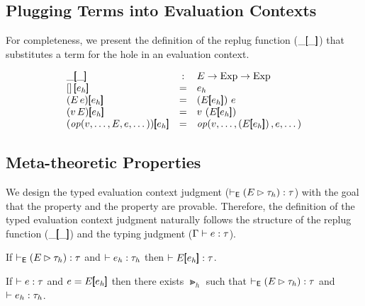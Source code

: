 \documentclass{article}
\begin{document}
\begin{prooftree}
\end{prooftree}

\subsection{Plugging Terms into Evaluation Contexts}

For completeness, we present the definition of the replug function
($\inholeb{\_}{\_}$) that substitutes a term for the hole in an evaluation context.

\[\begin{array}{lcl}
    \inholeb{\_}{\_} & : &
        E \to
        \text{Exp} \to
        \text{Exp}
        \\
    \inholeb{\THole\,}{e_h} & = &
        e_h
        \\
    \inholeb{\left(\TApp{E}{e}\right)}{e_h} & = &
        \TApp{\left( \inholeb{E}{e_h} \right)}{e}
        \\
    \inholeb{\left(\TApp{v}{E}\right)}{e_h} & = &
        \TApp{v}{\left( \inholeb{E}{e_h} \right)}
        \\
    \inholeb{\left(\TOp{v,\dots,E,e,\dots}\right)}{e_h} & = &
        \TOp{v,\dots,\left(\inholeb{E}{e_h}\right),e,\dots}
\end{array}\]

\subsection{Meta-theoretic Properties}

We design the typed evaluation context judgment ($\TContext{E}{\Gt_h}{\Gt}$)
with the goal that the  property and
the  property are provable.
Therefore, the definition of the typed evaluation context
judgment naturally follows the structure of the replug function
($\inholeb{\_}{\_}$) and the typing judgment ($\TTypes{\GG}{e}{\Gt}$).

\begin{prop}\label{prop:replug}
  If $\TContext{E}{\Gt_h}{\Gt}$ and $\TTypes{}{e_h}{\Gt_h}$ then $\TTypes{}{\inholeb{E}{e_h}}{\Gt}$.
\end{prop}

\begin{prop}\label{prop:decomposition}
  If $\TTypes{}{e}{\Gt}$ and $e=\inholeb{E}{e_h}$ then there exists
  $\Gt_h$ such that $\TContext{E}{\Gt_h}{\Gt}$ and $\TTypes{}{e_h}{\Gt_h}$.
\end{prop}
\end{document}
